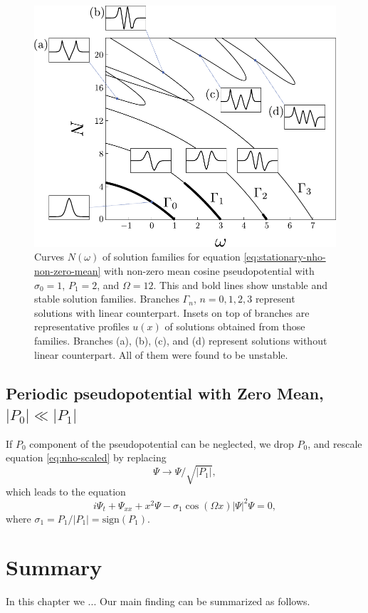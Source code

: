 \begin{figure}[h]
\centering
	\includegraphics[scale = 1]{pic/branches for cosine nho, case (a)}
	\caption{
		Curves $N(\omega)$ of solution families for equation \eqref{eq:stationary-nho-non-zero-mean} with non-zero mean cosine pseudopotential with $\sigma_0 = 1$, $P_1 = 2$, and $\Omega = 12$.
		This and bold lines show unstable and stable solution families.
		Branches $\Gamma_n$, $n = 0, 1, 2, 3$ represent solutions with linear counterpart.
		Insets on top of branches are representative profiles $u(x)$ of solutions obtained from those families.
		Branches (a), (b), (c), and (d) represent solutions without linear counterpart.
		All of them were found to be unstable.
	}
\label{fig:branches-cosine-nho-attractive}
\end{figure}

\subsection{Periodic pseudopotential with Zero Mean, $|P_0| \ll |P_1|$}

If $P_0$ component of the pseudopotential can be neglected, we drop $P_0$, and rescale equation \eqref{eq:nho-scaled} by replacing
\begin{equation}
	\Psi \to \Psi / \sqrt{|P_1|},
\end{equation}
which leads to the equation
\begin{equation}
	i \Psi_t + \Psi_{xx} + x^2 \Psi - \sigma_1 \cos (\Omega x) |\Psi|^2 \Psi = 0,
\label{eq:stationary-nho-zero-mean}
\end{equation}
where $\sigma_1 = P_1 / |P_1| = \mathrm{sign}(P_1)$.

\section{Summary}

In this chapter we ...
Our main finding can be summarized as follows.